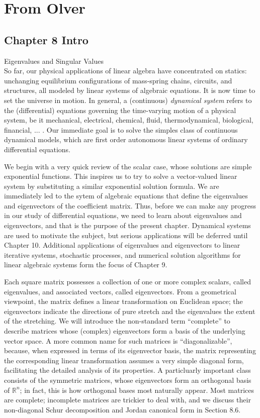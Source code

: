 \documentclass[12pt]{article}
\theoremstyle{remark}
\begin{document}
\section{From Olver}
\subsection*{Chapter 8 Intro}
{\Large Eigenvalues and Singular Values}\\
So far, our physical applications of linear algebra have concentrated on statics: unchanging equilibrium configurations of mass-spring chains, circuits, and structures, all modeled by linear systems of algebraic equations. It is now time to set the universe in motion. In general, a (continuous) \emph{dynamical system} refers to the (differential) equations governing the time-varying motion of a physical system, be it mechanical, electrical, chemical, fluid, thermodynamical, biological, financial, ... . Our immediate goal is to solve the simples class of continuous dynamical models, which are first order autonomous linear systems of ordinary differential equations.

We begin with a very quick review of the scalar case, whose solutions are simple exponential functions. This inspires us to try to solve a vector-valued linear system by substituting a similar exponential solution formula. We are immediately led to the sytem of algebraic equations that define the eigenvalues and eigenvectors of the coefficient matrix. Thus, before we can make any progress in our study of differential equations, we need to learn about eigenvalues and eigenvectors, and that is the purpose of the present chapter. Dynamical systems are used to motivate the subject, but serious applications will be deferred until Chapter 10. Additional applications of eigenvalues and eigenvectors to linear iterative systems, stochastic processes, and numerical solution algorithms for linear algebraic systems form the focus of Chapter 9.

Each square matrix possesses a collection of one or more complex scalars, called eigenvalues, and associated vectors, called eigenvectors. From a geometrical viewpoint, the matrix defines a linear transformation on Euclidean space; the eigenvectors indicate the directions of pure stretch and the eigenvalues the extent of the stretching. We will introduce the non-standard term ``complete'' to describe matrices whose (complex) eigenvectors form a basis of the underlying vector space. A more common name for such matrices is ``diagonalizable'', because, when expressed in terms of its eigenvector basis, the matrix representing the corresponding linear transformation assumes a very simple diagonal form, facilitating the detailed analysis of its properties. A particluarly important class consists of the symmetric matrices, whose eigenvectors form an orthogonal basis of $\mathbb{R}^n$; in fact, this is how orthogonal bases most naturally appear. Most matrices are complete; incomplete matrices are trickier to deal with, and we discuss their non-diagonal Schur decomposition and Jordan canonical form in Section 8.6.
\end{document}
